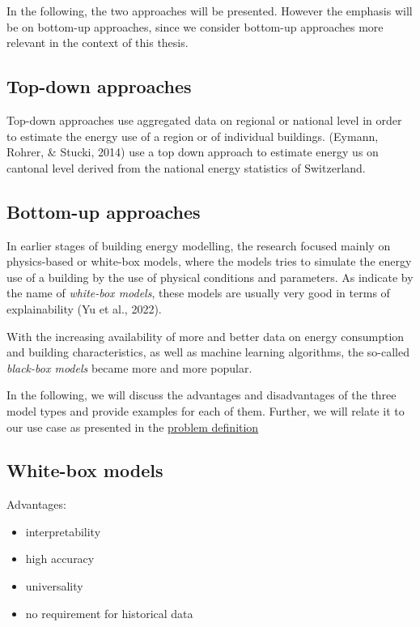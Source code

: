 \documentclass[
  letterpaper,
  DIV=11,
  numbers=noendperiod]{scrreprt}
\begin{document}
In the following, the two approaches will be presented. However the
emphasis will be on bottom-up approaches, since we consider bottom-up
approaches more relevant in the context of this thesis.

\hypertarget{top-down-approaches}{%
\subsection{Top-down approaches}\label{top-down-approaches}}

Top-down approaches use aggregated data on regional or national level in
order to estimate the energy use of a region or of individual buildings.
(Eymann, Rohrer, \& Stucki, 2014) use a top down approach to estimate
energy us on cantonal level derived from the national energy statistics
of Switzerland.

\hypertarget{bottom-up-approaches}{%
\subsection{Bottom-up approaches}\label{bottom-up-approaches}}

In earlier stages of building energy modelling, the research focused
mainly on physics-based or white-box models, where the models tries to
simulate the energy use of a building by the use of physical conditions
and parameters. As indicate by the name of \emph{white-box models},
these models are usually very good in terms of explainability (Yu et
al., 2022).

With the increasing availability of more and better data on energy
consumption and building characteristics, as well as machine learning
algorithms, the so-called \emph{black-box models} became more and more
popular.

In the following, we will discuss the advantages and disadvantages of
the three model types and provide examples for each of them. Further, we
will relate it to our use case as presented in the
\protect\hyperlink{problem-definition}{problem definition}

\hypertarget{white-box-models}{%
\subsection{White-box models}\label{white-box-models}}

Advantages:

\begin{itemize}
\item
  interpretability
\item
  high accuracy
\item
  universality
\item
  no requirement for historical data
\end{itemize}
\end{document}
